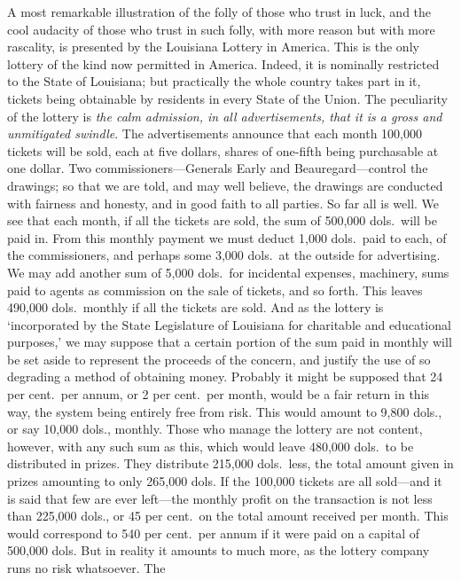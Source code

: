 \documentclass[letterpaper,12pt,oneside,openany]{memoir}
\begin{document}
A most remarkable illustration of the folly of those
who trust in luck, and the cool audacity of those who
trust in such folly, with more reason but with more
rascality, is presented by the Louisiana Lottery in
America. This is the only lottery of the kind now
permitted in America. Indeed, it is nominally restricted
to the State of Louisiana; but practically the whole
country takes part in it, tickets being obtainable by
residents in every State of the Union. The peculiarity
of the lottery is \textit{the calm admission, in all advertisements,
that it is a gross and unmitigated swindle}. The
advertisements announce that each month 100,000
tickets will be sold, each at five dollars, shares of one-fifth
being purchasable at one dollar. Two commissioners---Generals
Early and Beauregard---control the
drawings; so that we are told, and may well believe,
the drawings are conducted with fairness and honesty,
and in good faith to all parties. So far all is well. We
see that each month, if all the tickets are sold, the sum
of 500,000 dols.\ will be paid in. From this monthly
payment we must deduct 1,000 dols.\ paid to each, of the
commissioners, and perhaps some 3,000 dols.\ at the outside
for advertising. We may add another sum of
5,000 dols.\ for incidental expenses, machinery, sums
paid to agents as commission on the sale of tickets, and
so forth. This leaves 490,000 dols.\ monthly if all the
tickets are sold. And as the lottery is `incorporated by
the State Legislature of Louisiana for charitable and
educational purposes,' we may suppose that a certain
portion of the sum paid in monthly will be set aside to
represent the proceeds of the concern, and justify the
use of so degrading a method of obtaining money.
Probably it might be supposed that 24 per cent.\ per
annum, or 2 per cent.\ per month, would be a fair return
in this way, the system being entirely free from risk.
This would amount to 9,800 dols., or say 10,000 dols.,
monthly. Those who manage the lottery are not content,
however, with any such sum as this, which would
leave 480,000 dols.\ to be distributed in prizes. They
distribute 215,000 dols.\ less, the total amount given in
prizes amounting to only 265,000 dols. If the 100,000
tickets are all sold---and it is said that few are ever left---the
monthly profit on the transaction is not less than
225,000 dols., or 45 per cent.\ on the total amount
received per month. This would correspond to 540
per cent.\ per annum if it were paid on a capital of
500,000 dols. But in reality it amounts to much more,
as the lottery company runs no risk whatsoever. The
\end{document}
